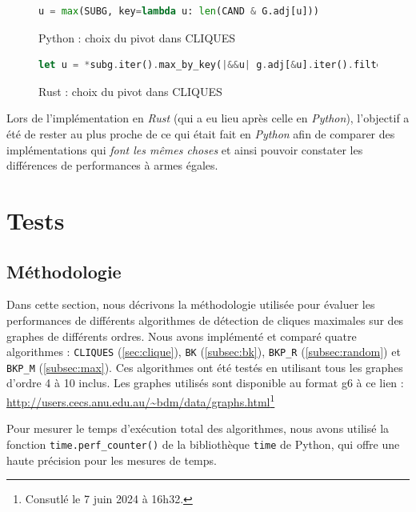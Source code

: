 \documentclass[12pt,a4paper]{article}
\begin{document}
\begin{figure}[ht]
  \begin{lstlisting}[language=Python]
    u = max(SUBG, key=lambda u: len(CAND & G.adj[u]))
  \end{lstlisting}
  \caption{Python : choix du pivot dans CLIQUES}
  \label{fig:p1}
\end{figure}

\begin{figure}[ht]
  \begin{lstlisting}[language=Rust]
    let u = *subg.iter().max_by_key(|&&u| g.adj[&u].iter().filter(|&&neighbor| cand.contains(&neighbor)).count()).unwrap();
  \end{lstlisting}
  \caption{Rust : choix du pivot dans CLIQUES}
  \label{fig:r1}
\end{figure}

Lors de l'implémentation en \emph{Rust} (qui a eu lieu après celle en \emph{Python}), l'objectif a été de rester au plus proche de ce qui était fait en \emph{Python} afin de comparer des implémentations qui \og \textit{font les mêmes choses} \fg{} et ainsi pouvoir constater les différences de performances à armes égales.


\section{Tests}%
\label{sec:tests}

\subsection{Méthodologie}%
\label{subsec:methodo}
Dans cette section, nous décrivons la méthodologie utilisée pour évaluer les performances de différents algorithmes de détection de cliques maximales sur des graphes de différents ordres. Nous avons implémenté et comparé quatre algorithmes : \texttt{CLIQUES} (\ref{sec:clique}), \texttt{BK} (\ref{subsec:bk}), \texttt{BKP\_R} (\ref{subsec:random}) et \texttt{BKP\_M} (\ref{subsec:max}). Ces algorithmes ont été testés en utilisant tous les graphes d'ordre 4 à 10 inclus. Les graphes utilisés sont disponible au format g6 à ce lien : \url{http://users.cecs.anu.edu.au/~bdm/data/graphs.html}\footnote{Consutlé le 7 juin 2024 à 16h32.}

Pour mesurer le temps d'exécution total des algorithmes, nous avons utilisé la fonction \texttt{time.perf\_counter()} de la bibliothèque \texttt{time} de Python, qui offre une haute précision pour les mesures de temps.
\end{document}
